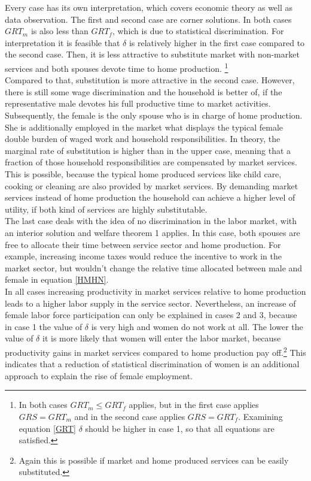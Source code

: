 \documentclass[a4paper,12pt]{article}
\begin{document}
Every case has its own interpretation, which covers economic theory as well as data observation. The first and second case are corner solutions. In both cases $GRT_m$ is also less than $GRT_f$, which is due to statistical discrimination. For interpretation it is feasible that $\delta$ is relatively higher in the first case compared to the second case. Then, it is less attractive to substitute market with non-market services and both spouses devote time to home production. \footnote{In both cases $GRT_m \leq GRT_f$ applies, but in the first case applies $GRS=GRT_m$ and in the second case applies $GRS=GRT_f$. Examining equation \eqref{GRT} $\delta$ should be higher in case 1, so that all equations are satisfied.} \\
Compared to that, substitution is more attractive in the second case. However, there is still some wage discrimination and the household is better of, if the representative male devotes his full productive time to market activities. Subsequently, the female is the only spouse who is in charge of home production. She is additionally employed in the market what displays the typical female double burden of waged work and household responsibilities. In theory, the marginal rate of substitution is higher than in the upper case, meaning that a fraction of those household responsibilities are compensated by market services. This is possible, because the typical home produced services like child care, cooking or cleaning are also provided by market services. By demanding market services instead of home production the household can achieve a higher level of utility, if both kind of services are highly substitutable.\\
The last case deals with the idea of no discrimination in the labor market, with an interior solution and welfare theorem 1 applies. In this case, both spouses are free to allocate their time between service sector and home production. For example, increasing income taxes would reduce the incentive to work in the market sector, but wouldn't change the relative time allocated between male and female in equation \eqref{HMHN}.\\
In all cases increasing productivity in market services relative to home production leads to a higher labor supply in the service sector. Nevertheless, an increase of female labor force participation can only be explained in cases 2 and 3, because in case 1 the value of $\delta$ is very high and women do not work at all. The lower the value of $\delta$ it is more likely that women will enter the labor market, because productivity gains in market services compared to home production pay off.\footnote{Again this is possible if market and home produced services can be easily substituted.} This indicates that a reduction of statistical discrimination of women is an additional approach to explain the rise of female employment.\\
\end{document}
